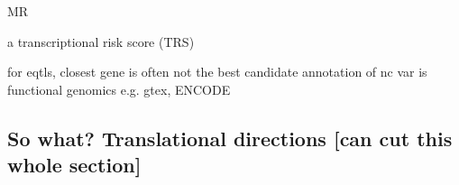 \begin{outline}
    \2 MR

    \2 a transcriptional risk score (TRS)

\1 for eqtls, closest gene is often not the best candidate
    \2 annotation of nc var is functional genomics
        \3 e.g. gtex, ENCODE
\end{outline}

\subsection{So what? Translational directions [can cut this whole section]}

